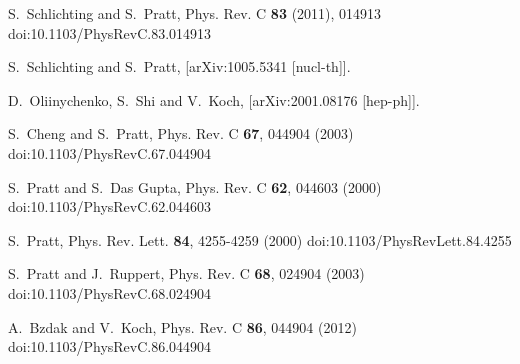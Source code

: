 \begin{thebibliography}{99}
S.~Schlichting and S.~Pratt,
Phys. Rev. C \textbf{83} (2011), 014913
doi:10.1103/PhysRevC.83.014913

S.~Schlichting and S.~Pratt,
[arXiv:1005.5341 [nucl-th]].

D.~Oliinychenko, S.~Shi and V.~Koch,
[arXiv:2001.08176 [hep-ph]].

S.~Cheng and S.~Pratt,
Phys. Rev. C \textbf{67}, 044904 (2003)
doi:10.1103/PhysRevC.67.044904
	
S.~Pratt and S.~Das Gupta,
Phys. Rev. C \textbf{62}, 044603 (2000)
doi:10.1103/PhysRevC.62.044603

S.~Pratt,
Phys. Rev. Lett. \textbf{84}, 4255-4259 (2000)
doi:10.1103/PhysRevLett.84.4255


S.~Pratt and J.~Ruppert,
Phys. Rev. C \textbf{68}, 024904 (2003)
doi:10.1103/PhysRevC.68.024904


A.~Bzdak and V.~Koch,
Phys. Rev. C \textbf{86}, 044904 (2012)
doi:10.1103/PhysRevC.86.044904


\end{thebibliography}
